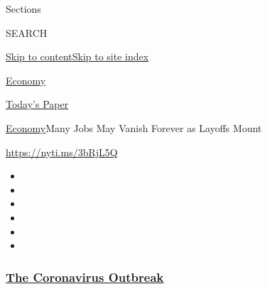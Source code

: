 Sections

SEARCH

\protect\hyperlink{site-content}{Skip to
content}\protect\hyperlink{site-index}{Skip to site index}

\href{https://www.nytimes3xbfgragh.onion/section/business/economy}{Economy}

\href{https://myaccount.nytimes3xbfgragh.onion/auth/login?response_type=cookie\&client_id=vi}{}

\href{https://www.nytimes3xbfgragh.onion/section/todayspaper}{Today's
Paper}

\href{/section/business/economy}{Economy}\textbar{}Many Jobs May Vanish
Forever as Layoffs Mount

\url{https://nyti.ms/3bRjL5Q}

\begin{itemize}
\item
\item
\item
\item
\item
\item
\end{itemize}

\hypertarget{the-coronavirus-outbreak}{%
\subsubsection{\texorpdfstring{\href{https://www.nytimes3xbfgragh.onion/news-event/coronavirus?name=styln-coronavirus-markets\&region=TOP_BANNER\&variant=undefined\&block=storyline_menu_recirc\&action=click\&pgtype=Article\&impression_id=5676ac50-e39d-11ea-96e4-f332f848a5e5}{The
Coronavirus
Outbreak}}{The Coronavirus Outbreak}}\label{the-coronavirus-outbreak}}

